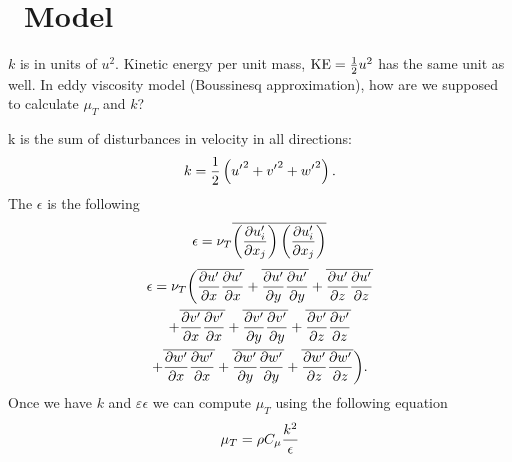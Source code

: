 \chapter{\texorpdfstring{\keModel}\ \ Model}

\(k\) is in units of \(u^2\).
Kinetic energy per unit mass, \(\text{KE} = \frac{1}{2} u^2\) has the same unit as well.
In eddy viscosity model (Boussinesq approximation), how are we supposed to calculate $\mu_T$ and $k$?

k is the sum of disturbances in velocity in all directions:
%
\begin{equation}
k = \frac{1}{2} \left({u^\prime}^2 + {v^\prime}^2 + {w^\prime}^2\right).
\end{equation}
%
%
The \(\epsilon\) is the following
%
\begin{equation}
\epsilon = \nu_T \overline{ \left(\f{\p u^\prime_i}{\p x_j}\right) \left(\f{\p u^\prime_i}{\p x_j}\right) }
\end{equation}
%
\begin{multline}
  \epsilon = \nu_T \biggl( \overline{ \f{\p u^\prime}{\p x} \f{\p u^\prime}{\p x} }
    + \overline{ \f{\p u^\prime}{\p y} \f{\p u^\prime}{\p y} }
    + \overline{ \f{\p u^\prime}{\p z} \f{\p u^\prime}{\p z} }  \\
    + \overline{ \f{\p v^\prime}{\p x} \f{\p v^\prime}{\p x} }
    + \overline{ \f{\p v^\prime}{\p y} \f{\p v^\prime}{\p y} }
    + \overline{ \f{\p v^\prime}{\p z} \f{\p v^\prime}{\p z} } \\
    + \overline{ \f{\p w^\prime}{\p x} \f{\p w^\prime}{\p x} }
    + \overline{ \f{\p w^\prime}{\p y} \f{\p w^\prime}{\p y} }
    + \overline{ \f{\p w^\prime}{\p z} \f{\p w^\prime}{\p z} }
    \biggr).
\end{multline}
%
Once we have \(k\) and \(\varepsilon \epsilon\) we can compute $\mu_T$ using the following equation
%
\begin{equation}
  \mu_T = \rho C_\mu \f{k^2}{\epsilon}
  \label{eq:ke-mut-formula}
\end{equation}
